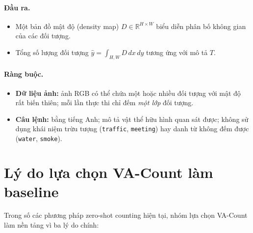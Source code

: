 \documentclass[a4paper,12pt]{report}
\numberwithin{figure}{chapter}
\numberwithin{table}{chapter}
\begin{document}
\paragraph{Đầu ra.}
\begin{itemize}
    \item Một bản đồ mật độ (density map) $D \in \mathbb{R}^{H \times W}$ biểu diễn phân bố không gian của các đối tượng.
    \item Tổng số lượng đối tượng $\hat{y} = \int_{H,W} D \, dx\, dy$ tương ứng với mô tả $T$.
\end{itemize}

\paragraph{Ràng buộc.}
\begin{itemize}
    \item \textbf{Dữ liệu ảnh:} ảnh RGB có thể chứa một hoặc nhiều đối tượng với mật độ rất biến thiên; mỗi lần thực thi chỉ đếm \emph{một lớp} đối tượng.
    \item \textbf{Câu lệnh:} bằng tiếng Anh; mô tả vật thể hữu hình quan sát được; không sử dụng khái niệm trừu tượng (\texttt{traffic}, \texttt{meeting}) hay danh từ không đếm được (\texttt{water}, \texttt{smoke}).
\end{itemize}

\section{Lý do lựa chọn VA-Count làm baseline}
\label{sec:why-vacount}

Trong số các phương pháp zero-shot counting hiện tại, nhóm lựa chọn VA-Count~\cite{vacount} làm nền tảng vì ba lý do chính:
\end{document}
